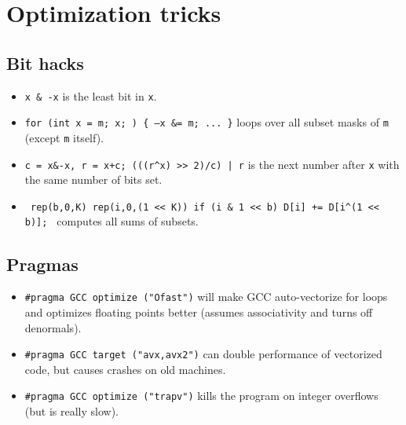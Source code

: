 \section{Optimization tricks}
\subsection{Bit hacks}
\begin{itemize}
	\item \texttt{x \& -x} is the least bit in \texttt{x}.
	\item \texttt{for (int x = m; x; ) \{ --x \&= m; ... \}} loops over all subset masks of \texttt{m} (except \texttt{m} itself).
	\item \texttt{c = x\&-x, r = x+c; (((r\^{}x) >> 2)/c) | r} is the next number after \texttt{x} with the same number of bits set.
	\item \texttt{ rep(b,0,K) rep(i,0,(1 << K)) if (i \& 1 << b) D[i] += D[i\^{}(1 << b)]; } computes all sums of subsets.
\end{itemize}
\subsection{Pragmas}
\begin{itemize}
	\item \lstinline{#pragma GCC optimize ("Ofast")} will make GCC auto-vectorize for loops and optimizes floating points better (assumes associativity and turns off denormals).
	\item \lstinline{#pragma GCC target ("avx,avx2")} can double performance of vectorized code, but causes crashes on old machines.
	\item \lstinline{#pragma GCC optimize ("trapv")} kills the program on integer overflows (but is really slow).
\end{itemize}
